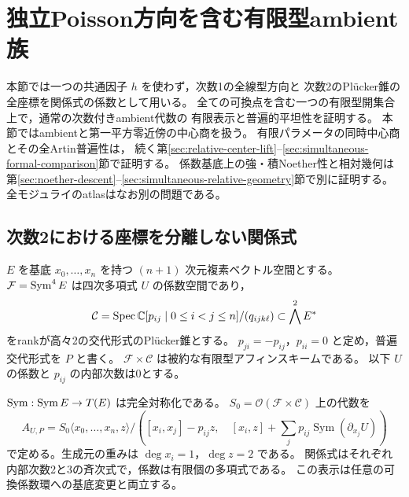\section{独立Poisson方向を含む有限型ambient族}
\label{sec:simultaneous-poisson}

本節では一つの共通因子 $h$ を使わず，次数1の全線型方向と
次数2のPl\"ucker錐の全座標を関係式の係数として用いる。
全ての可換点を含む一つの有限型開集合上で，通常の次数付きambient代数の
有限表示と普遍的平坦性を証明する。
本節ではambientと第一平方零近傍の中心商を扱う。
有限パラメータの同時中心商とその全Artin普遍性は，
続く第\ref{sec:relative-center-lift}--\ref{sec:simultaneous-formal-comparison}節で証明する。
係数基底上の強・積Noether性と相対幾何は
第\ref{sec:noether-descent}--\ref{sec:simultaneous-relative-geometry}節で別に証明する。
全モジュライのatlasはなお別の問題である。

\subsection{次数2における座標を分離しない関係式}

$E$ を基底 $x_0,\ldots,x_n$ を持つ $(n+1)$ 次元複素ベクトル空間とする。
$\mathcal F=\operatorname{Sym}^4E$ は四次多項式 $U$ の係数空間であり，
\[
 \mathcal C=\operatorname{Spec}\mathbb C[p_{ij}\mid 0\le i<j\le n]/(q_{ijk\ell})
       \subset\bigwedge^2E^*
\]
をrankが高々2の交代形式のPl\"ucker錐とする。
$p_{ji}=-p_{ij}$，$p_{ii}=0$ と定め，普遍交代形式を $P$ と書く。
$\mathcal F\times\mathcal C$ は被約な有限型アフィンスキームである。
以下 $U$ の係数と $p_{ij}$ の内部次数は0とする。

$\operatorname{Sym}:\operatorname{Sym} E\to T(E)$ は完全対称化である。
$S_0=\mathcal O(\mathcal F\times\mathcal C)$ 上の代数を
\begin{equation}\label{eq:simultaneous-ambient-relations}
 A_{U,P}=
 S_0\langle x_0,\ldots,x_n,z\rangle\Big/
 \left(
 [x_i,x_j]-p_{ij}z,\quad
 [x_i,z]+\sum_jp_{ij}\operatorname{Sym}(\partial_{x_j}U)
 \right)
\end{equation}
で定める。生成元の重みは $\deg x_i=1$，$\deg z=2$ である。
関係式はそれぞれ内部次数2と3の斉次式で，係数は有限個の多項式である。
この表示は任意の可換係数環への基底変更と両立する。

